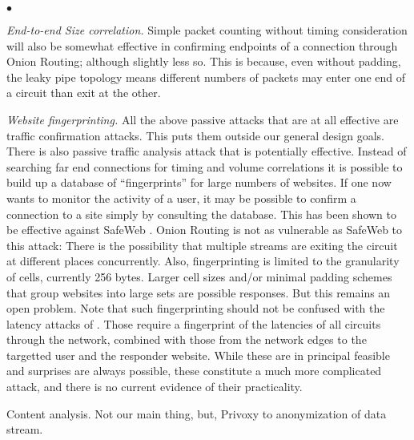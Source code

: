\documentclass[times,10pt,twocolumn]{article}
\newenvironment{tightlist}{\begin{list}{$\bullet$}{
  \setlength{\itemsep}{0mm}
    \setlength{\parsep}{0mm}
    }}{\end{list}}
\begin{document}
\begin{tightlist}
\item \emph{End-to-end Size correlation.} Simple packet counting
  without timing consideration will also be somewhat effective in
  confirming endpoints of a connection through Onion Routing; although
  slightly less so. This is because, even without padding, the leaky
  pipe topology means different numbers of packets may enter one end
  of a circuit than exit at the other.
  
\item \emph{Website fingerprinting.} All the above passive
  attacks that are at all effective are traffic confirmation attacks.
  This puts them outside our general design goals. There is also
  passive traffic analysis attack that is potentially effective.
  Instead of searching far end connections for timing and volume
  correlations it is possible to build up a database of
  ``fingerprints'' for large numbers of websites. If one now wants to
  monitor the activity of a user, it may be possible to confirm a
  connection to a site simply by consulting the database. This has
  been shown to be effective against SafeWeb \cite{hintz-pet02}. Onion
  Routing is not as vulnerable as SafeWeb to this attack: There is the
  possibility that multiple streams are exiting the circuit at
  different places concurrently.  Also, fingerprinting is limited to
  the granularity of cells, currently 256 bytes. Larger cell sizes
  and/or minimal padding schemes that group websites into large sets
  are possible responses.  But this remains an open problem. Note that
  such fingerprinting should not be confused with the latency attacks
  of \cite{back01}. Those require a fingerprint of the latencies of
  all circuits through the network, combined with those from the
  network edges to the targetted user and the responder website. While
  these are in principal feasible and surprises are always possible,
  these constitute a much more complicated attack, and there is no
  current evidence of their practicality.


\item Content analysis. Not our main thing, but, Privoxy to
  anonymization of data stream.

\end{tightlist}
\end{document}
